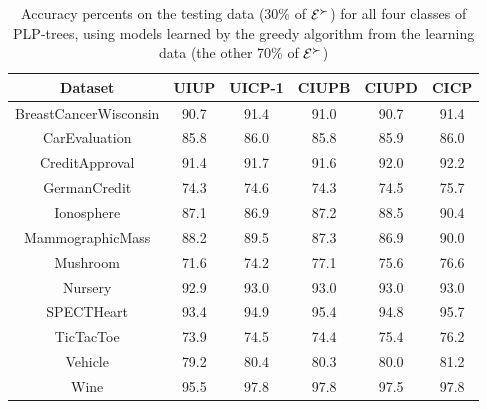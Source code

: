 \begin{table}
  \centering
  \small
	\setlength\tabcolsep{6pt}
  \begin{tabular}{ |c||c|c|c|c|c| }
    \hline
    Dataset          	 & UIUP & UICP-1 & CIUPB & CIUPD & CICP \\
    \hline \hline                                             
    BreastCancerWisconsin                & 90.7 & 91.4   & 91.0  & 90.7  & 91.4   \\ \hline
    CarEvaluation                 & 85.8 & 86.0   & 85.8  & 85.9  & 86.0   \\ \hline
    CreditApproval                 & 91.4 & 91.7   & 91.6  & 92.0  & 92.2   \\ \hline
    GermanCredit                 & 74.3 & 74.6   & 74.3  & 74.5  & 75.7   \\ \hline
    Ionosphere                 & 87.1 & 86.9   & 87.2  & 88.5  & 90.4   \\ \hline
    MammographicMass                 & 88.2 & 89.5   & 87.3  & 86.9  & 90.0   \\ \hline
    Mushroom                 & 71.6 & 74.2   & 77.1  & 75.6  & 76.6   \\ \hline
    Nursery                 & 92.9 & 93.0   & 93.0  & 93.0  & 93.0   \\ \hline
    SPECTHeart                 & 93.4 & 94.9   & 95.4  & 94.8  & 95.7   \\ \hline
    TicTacToe                & 73.9 & 74.5   & 74.4  & 75.4  & 76.2   \\ \hline
    Vehicle                 & 79.2 & 80.4   & 80.3  & 80.0  & 81.2   \\ \hline
    Wine                 & 95.5 & 97.8   & 97.8  & 97.5  & 97.8   \\ \hline
  \end{tabular}
  \caption{Accuracy percents on the testing data (30\% of $\mathcal{E}^\succ$)
					 for all four classes of PLP-trees, using models learned
					 by the greedy algorithm from the learning 
					 data (the other 70\% of $\mathcal{E}^\succ$)}
  \label{tbl:trees2}
\end{table}


